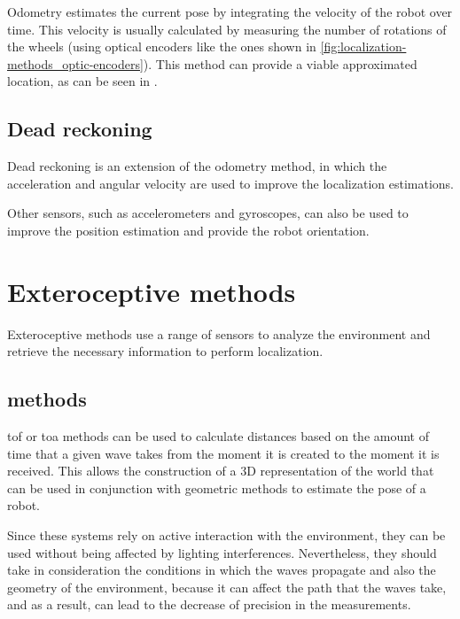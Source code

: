 Odometry estimates the current pose by integrating the velocity of the robot over time. This velocity is usually calculated by measuring the number of rotations of the wheels (using optical encoders like the ones shown in \cref{fig:localization-methods_optic-encoders}). This method can provide a viable approximated location, as can be seen in \cite{Reinstein2013}.



\subsection{Dead reckoning}

Dead reckoning is an extension of the odometry method, in which the acceleration and angular velocity are used to improve the localization estimations.

Other sensors, such as accelerometers and gyroscopes, can also be used to improve the position estimation \cite{Ibraheem2010} and provide the robot orientation.



\section{Exteroceptive methods}

Exteroceptive methods use a range of sensors to analyze the environment and retrieve the necessary information to perform localization.


\subsection{ methods}

\gls{tof} or \gls{toa} methods can be used to calculate distances based on the amount of time that a given wave takes from the moment it is created to the moment it is received. This allows the construction of a 3D representation of the world that can be used in conjunction with geometric methods to estimate the pose of a robot.

Since these systems rely on active interaction with the environment, they can be used without being affected by lighting interferences. Nevertheless, they should take in consideration the conditions in which the waves propagate and also the geometry of the environment, because it can affect the path that the waves take, and as a result, can lead to the decrease of precision in the measurements.


